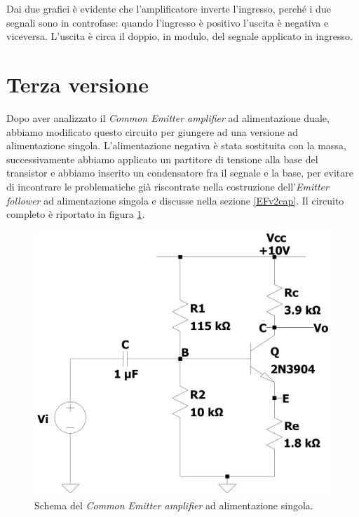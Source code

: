\documentclass{report}
\begin{document}
\\\\Dai due grafici è evidente che l'amplificatore inverte l'ingresso, perché i due segnali sono in controfase: quando l'ingresso è positivo l'uscita è negativa e viceversa. L'uscita è circa il doppio, in modulo, del segnale applicato in ingresso. 
\section{Terza versione} \label{CEv3_cap} %
Dopo aver analizzato il \textit{Common Emitter amplifier} ad alimentazione duale, abbiamo modificato questo circuito per giungere ad una versione ad alimentazione singola. L'alimentazione negativa è stata sostituita con la massa, successivamente abbiamo applicato un partitore di tensione alla base del transistor e abbiamo inserito un condensatore fra il segnale e la base, per evitare di incontrare le problematiche già riscontrate nella costruzione dell'\textit{Emitter follower} ad alimentazione singola e discusse nella sezione \ref{EFv2cap}. Il circuito completo è riportato in figura \ref{figura:CEv3}.
\begin{figure}[h]
\centering
\includegraphics[height=10cm]{immagini/CEv3}
\caption{Schema del \textit{Common Emitter amplifier} ad alimentazione singola.}
\label{figura:CEv3}
\end{figure}
\end{document}
